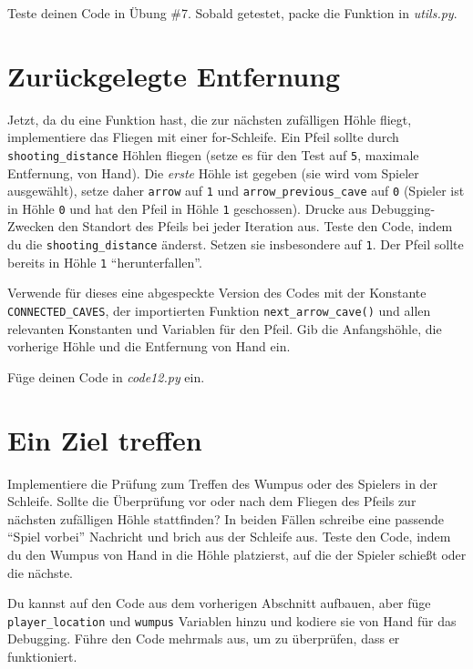 \documentclass[
]{book}
\begin{document}
Teste deinen Code in Übung \#7.
Sobald getestet, packe die Funktion in \emph{utils.py}.

\hypertarget{zuruxfcckgelegte-entfernung}{%
\section{Zurückgelegte Entfernung}\label{zuruxfcckgelegte-entfernung}}

Jetzt, da du eine Funktion hast, die zur nächsten zufälligen Höhle fliegt, implementiere das Fliegen mit einer for-Schleife. Ein Pfeil sollte durch \texttt{shooting\_distance} Höhlen fliegen (setze es für den Test auf \texttt{5}, maximale Entfernung, von Hand). Die \emph{erste} Höhle ist gegeben (sie wird vom Spieler ausgewählt), setze daher \texttt{arrow} auf \texttt{1} und \texttt{arrow\_previous\_cave} auf \texttt{0} (Spieler ist in Höhle \texttt{0} und hat den Pfeil in Höhle \texttt{1} geschossen). Drucke aus Debugging-Zwecken den Standort des Pfeils bei jeder Iteration aus. Teste den Code, indem du die \texttt{shooting\_distance} änderst. Setzen sie insbesondere auf \texttt{1}. Der Pfeil sollte bereits in Höhle \texttt{1} ``herunterfallen''.

Verwende für dieses eine abgespeckte Version des Codes mit der Konstante \texttt{CONNECTED\_CAVES}, der importierten Funktion \texttt{next\_arrow\_cave()} und allen relevanten Konstanten und Variablen für den Pfeil. Gib die Anfangshöhle, die vorherige Höhle und die Entfernung von Hand ein.

Füge deinen Code in \emph{code12.py} ein.

\hypertarget{ein-ziel-treffen}{%
\section{Ein Ziel treffen}\label{ein-ziel-treffen}}

Implementiere die Prüfung zum Treffen des Wumpus oder des Spielers in der Schleife. Sollte die Überprüfung vor oder nach dem Fliegen des Pfeils zur nächsten zufälligen Höhle stattfinden? In beiden Fällen schreibe eine passende ``Spiel vorbei'' Nachricht und brich aus der Schleife aus. Teste den Code, indem du den Wumpus von Hand in die Höhle platzierst, auf die der Spieler schießt oder die nächste.

Du kannst auf den Code aus dem vorherigen Abschnitt aufbauen, aber füge \texttt{player\_location} und \texttt{wumpus} Variablen hinzu und kodiere sie von Hand für das Debugging. Führe den Code mehrmals aus, um zu überprüfen, dass er funktioniert.
\end{document}
